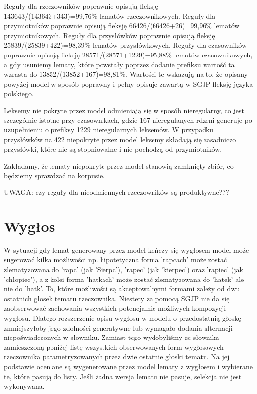 \documentclass{article}
\begin{document}
Reguły dla rzeczowników poprawnie opisują fleksję 143643/(143643+343)=99,76\% lematów rzeczownikowych. %
Reguły dla przymiotników poprawnie opisują fleksję 66426/(66426+26)=99,96\% lematów przymiotnikowych.
Reguły dla przysłówków poprawnie opisują fleksję 25839/(25839+422)=98,39\% lematów przysłówkowych. 
Reguły dla czasowników poprawnie opisują fleksję 28571/(28571+1229)=95,88\% lematów czasownikowych,
a gdy usuniemy lematy, które powstały poprzez dodanie prefiksu wartość ta wzrasta do 13852/(13852+167)=98,81\%.
Wartości te wskazują na to, że opisany powyżej model w sposób poprawny i pełny opisuje zawartą w SGJP fleksję języka polskiego.

Leksemy nie pokryte przez model odmieniają się w sposób nieregularny, co jest szczególnie istotne przy czasownikach, 
gdzie 167 nieregulanych rdzeni generuje po uzupełnieniu o prefiksy 1229 nieregularnych leksemów. W przypadku przysłówków
na 422 niepokryte przez model leksemy składają się zasadniczo przysłówki, które nie są stopniowalne i nie pochodzą od przymiotników.

Zakładamy, że lematy niepokryte przez model stanowią zamknięty zbiór, co będziemy sprawdzać na korpusie.

UWAGA: czy reguły dla nieodmiennych rzeczowników są produktywne???

\section{Wygłos}

W sytuacji gdy lemat generowany przez model kończy się wygłosem model może sugerować kilka możliwości 
np. hipotetyczna forma 'rapcach' może zostać zlematyzowana do 'rapc' (jak 'Sierpc'), 'rapec' (jak 'kierpec') oraz 'rapiec' (jak 'chłopiec'),
a z kolei forma 'hatkach'  może zostać zlematyzowana do 'hatek' ale nie do 'hatk'.
To, które możliwości są akceptowalnymi formami zależy od dwu ostatnich głosek tematu rzeczownika. 
Niestety za pomocą SGJP nie da się zaobserwować zachowania wszystkich potencjalnie możliwych kompozycji wygłosu.
Dlatego rozszerzenie opisu wygłosu w modelu o przedostatnią głoskę zmniejszyłoby jego zdolności generatywne
lub wymagało dodania alternacji niepoświadczonych w słowniku.
Zamiast tego wydobyliśmy ze słownika zamieszczoną poniżej listę wszystkich obserwowanych form wygłosowych rzeczownika 
parametryzowanych przez dwie ostatnie głoski tematu. Na jej podstawie oceniane są wygenerowane przez model lematy z wygłosem
i wybierane te, które pasują do listy. Jeśli żadna wersja lematu nie pasuje, selekcja nie jest wykonywana.
\end{document}
